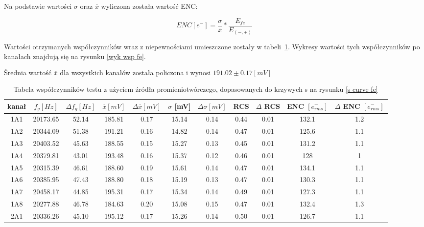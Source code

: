 Na podstawie wartości $\sigma$ oraz $\overline{x}$ wyliczona została wartość ENC:

\begin{equation}
        ENC [e^-] = \frac{\sigma}{\overline{x}} * \frac{E_{fe}}{E_{(-,+)}}
\end{equation}

Wartości otrzymanych współczynników wraz z niepewnościami umieszczone zostały w tabeli~\ref{tabela wsp fe}. Wykresy wartości tych współczynników po kanałach znajdują się na rysunku \ref{wyk wsp fe}.

Średnia wartość $\overline{x}$ dla wszystkich kanałów została policzona i wynosi $191.02 \pm 0.17 [mV]$


\begin{table}
        \centering
        \caption{Tabela współczynników testu z użyciem źródła promieniotwórczego, dopasowanych do krzywych s na rysunku \ref{s curve fe}}
        \label{tabela wsp fe}
        \begin{adjustbox}{width=1.1\linewidth,center}
                \begin{tabular}{|c|c|c|c|c|c|c|c|c|c|c|}
                \hline
                kanał & $f_g [Hz]$&$\Delta f_g [Hz]$&$\overline{x} [mV]$&$\Delta \overline{x} [mV]$&  $\sigma$ [mV]&  $\Delta \sigma [mV]$ &RCS&$\Delta$ RCS& ENC $[e^-_{rms}]$& $\Delta$ ENC $[e^-_{rms}]$\\ \hline
                1A1&20173.65&52.14&185.81&0.17&15.14&0.14&0.44&0.01&132.1&1.2  \\ \hline 
                1A2&20344.09&51.38&191.21&0.16&14.82&0.14&0.47&0.01&125.6&1.1  \\ \hline 
                1A3&20403.52&45.63&188.55&0.15&15.27&0.13&0.45&0.01&131.2&1.1  \\ \hline 
                1A4&20379.81&43.01&193.48&0.16&15.37&0.12&0.46&0.01&128&1  \\ \hline 
                1A5&20315.39&46.61&188.60&0.19&15.61&0.14&0.47&0.01&134.1&1.1  \\ \hline 
                1A6&20385.95&47.43&188.80&0.18&15.19&0.13&0.47&0.01&130.3&1.1  \\ \hline 
                1A7&20458.17&44.85&195.31&0.17&15.34&0.14&0.49&0.01&127.3&1.1  \\ \hline 
                1A8&20277.88&46.78&184.63&0.20&15.08&0.15&0.47&0.01&132.4&1.3  \\ \hline 
                2A1&20336.26&45.10&195.12&0.17&15.26&0.14&0.50&0.01&126.7&1.1  \\ \hline 

\end{tabular}
\end{adjustbox}
\end{table}

